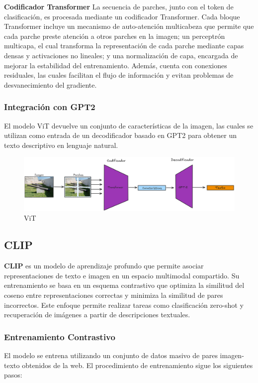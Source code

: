 			\textbf{Codificador Transformer}
				La secuencia de parches, junto con el token de clasificación, es procesada mediante un codificador Transformer. Cada bloque Transformer incluye un mecanismo de auto-atención multicabeza que permite que cada parche preste atención a otros parches en la imagen; un perceptrón multicapa, el cual transforma la representación de cada parche mediante capas densas y activaciones no lineales; y  una normalización de capa, encargada de mejorar la estabilidad del entrenamiento. Además, cuenta con conexiones residuales, las cuales facilitan el flujo de información y evitan problemas de desvanecimiento del gradiente.

		\subsubsection*{Integración con GPT2}
			El modelo ViT devuelve un conjunto de características de la imagen, las cuales se utilizan como entrada de un decodificador basado en GPT2 para obtener un texto descriptivo en lenguaje natural.

			\begin{figure}[h] 
				\centering
				\includegraphics[width=1\textwidth]{Graphics/ViT}
				\caption{ViT}
				\label{fig:ViT}
			\end{figure}


	\subsection{CLIP}
		\textbf{CLIP} \cite{radford2021learning} es un modelo de aprendizaje profundo que permite asociar representaciones de texto e imagen en un espacio multimodal compartido. Su entrenamiento se basa en un esquema contrastivo que optimiza la similitud del coseno entre representaciones correctas y minimiza la similitud de pares incorrectos. Este enfoque permite realizar tareas como clasificación zero-shot y recuperación de imágenes a partir de descripciones textuales.

		\subsubsection*{Entrenamiento Contrastivo}
			El modelo se entrena utilizando un conjunto de datos masivo de pares imagen-texto obtenidos de la web. El procedimiento de entrenamiento sigue los siguientes pasos:
			
